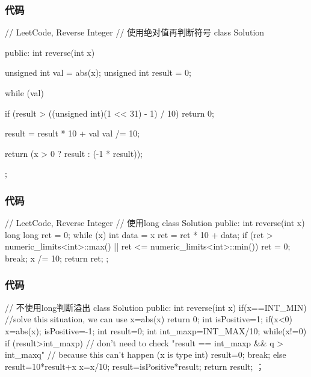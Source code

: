 \subsubsection{代码}
\begin{Code}
// LeetCode, Reverse Integer
// 使用绝对值再判断符号
class Solution {
public:
int reverse(int x) {
        unsigned int val = abs(x);
        unsigned int result = 0;

        while (val) {
            if (result > ((unsigned int)(1 << 31) - 1) / 10)
                return 0;

            result = result * 10 + val %
            val /= 10;
        }

        return (x > 0 ? result : (-1 * result));
    }
};
\end{Code}

\subsubsection{代码}
\begin{Code}
// LeetCode, Reverse Integer
// 使用long
class Solution {
public:
    int reverse(int x) {
        long long ret = 0;
        while (x) {
            int data = x %
            ret = ret * 10 + data;
            if (ret > numeric_limits<int>::max() || ret <= numeric_limits<int>::min()) {
                ret = 0;
                break;
            }
            x /= 10;
        }
        return ret;
    }
};
\end{Code}

\subsubsection{代码}
\begin{Code}
// 不使用long判断溢出
class Solution {
public:
    int reverse(int x) {
        if(x==INT_MIN)
        //solve this situation, we can use x=abs(x)
            return 0;
        int isPositive=1;
        if(x<0)
        {
            x=abs(x);
            isPositive=-1;
        }
        int result=0;
        int int_maxp=INT_MAX/10;
        while(x!=0)
        {
            if (result>int_maxp)
            // don't need to check "result == int_maxp && q > int_maxq"
            // because this can't happen (x is type int)
            {
                result=0;
                break;
            }
            else
                result=10*result+x%
            x=x/10;
        }
        result=isPositive*result;
        return result;
    }
}；
\end{Code}

